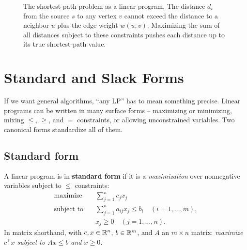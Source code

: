 \begin{figure}[H]
\centering
{}
\caption{The shortest-path problem as a linear program. The distance $d_v$ from the source $s$ to any vertex $v$ cannot exceed the distance to a neighbor $u$ plus the edge weight $w(u,v)$. Maximizing the sum of all distances subject to these constraints pushes each distance up to its true shortest-path value.}
\label{ch28:fig-shortest-path-lp}
\end{figure}

\section{Standard and Slack Forms}
\label{ch28:forms}

If we want general algorithms, ``any LP'' has to mean something precise.
Linear programs can be written in many surface forms -- maximizing or
minimizing, mixing $\le$, $\ge$, and $=$ constraints, or allowing unconstrained
variables. Two canonical forms standardize all of them.

\subsection{Standard form}

\begin{formalbox}
A linear program is in \textbf{standard form} if it is a \emph{maximization}
over nonnegative variables subject to $\le$ constraints:
\[
\begin{aligned}
\text{maximize}\quad   & \sum_{j=1}^{n} c_j x_j \\
\text{subject to}\quad & \sum_{j=1}^{n} a_{ij} x_j \le b_i \quad (i = 1,\dots,m),\\
                       & x_j \ge 0 \quad (j = 1,\dots,n).
\end{aligned}
\]
In matrix shorthand, with $c,x \in \mathbb{R}^n$, $b \in \mathbb{R}^m$, and $A$ an $m\times n$
matrix: \emph{maximize $c^\top x$ subject to $Ax \le b$ and $x \ge 0$.}
\end{formalbox}

